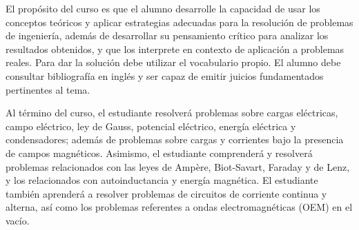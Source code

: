 \begin{syllabus}


\begin{justification}
El propósito del curso es que el alumno desarrolle la capacidad de usar los conceptos teóricos y aplicar estrategias adecuadas para la resolución de problemas de ingeniería, además de desarrollar su pensamiento crítico para analizar los resultados obtenidos, y que los interprete en contexto de aplicación a problemas reales. Para dar la solución debe utilizar el vocabulario propio. El alumno debe consultar bibliografía en inglés y ser capaz de emitir juicios fundamentados pertinentes al tema. 
\end{justification}

\begin{goals}
\item Al término del curso, el estudiante resolverá problemas sobre cargas eléctricas, campo eléctrico, ley de Gauss, potencial eléctrico, energía eléctrica y condensadores; además de problemas sobre cargas y corrientes bajo la presencia de campos magnéticos. Asimismo, el estudiante comprenderá y resolverá problemas relacionados con las leyes de Ampère, Biot-Savart, Faraday y de Lenz, y los relacionados con autoinductancia y energía magnética. El estudiante también aprenderá a resolver problemas de circuitos de corriente continua y alterna, así como los problemas referentes a ondas electromagnéticas (OEM) en el vacío.
\end{goals}

\begin{outcomes}
\item {}
\item {}
\end{outcomes}

\begin{competences}
    \item {}
\end{competences}


\end{syllabus}

